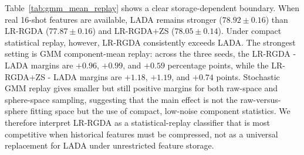 \documentclass{article}
\begin{document}
\begin{table}[t]
\centering
\caption{Classifier comparison under real-feature and statistical-replay protocols on X-TAIL 16-shot. All classifiers are built with \texttt{classifier\_feature\_transform=test} and evaluated on the same full test set. Results are averaged over seeds 42/43/44.}
\label{tab:gmm_mean_replay}
\end{table}

Table~\ref{tab:gmm_mean_replay} shows a clear storage-dependent boundary. When real 16-shot features are available, LADA remains stronger ($78.92{\pm}0.16$) than LR-RGDA ($77.87{\pm}0.16$) and LR-RGDA+ZS ($78.05{\pm}0.14$). Under compact statistical replay, however, LR-RGDA consistently exceeds LADA. The strongest setting is GMM component-mean replay: across the three seeds, the LR-RGDA - LADA margins are $+0.96$, $+0.99$, and $+0.59$ percentage points, while the LR-RGDA+ZS - LADA margins are $+1.18$, $+1.19$, and $+0.74$ points. Stochastic GMM replay gives smaller but still positive margins for both raw-space and sphere-space sampling, suggesting that the main effect is not the raw-versus-sphere fitting space but the use of compact, low-noise component statistics. We therefore interpret LR-RGDA as a statistical-replay classifier that is most competitive when historical features must be compressed, not as a universal replacement for LADA under unrestricted feature storage.
\end{document}
